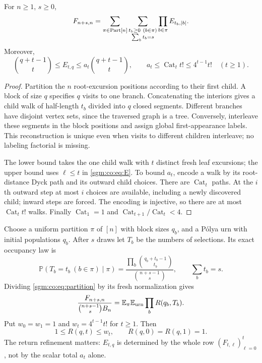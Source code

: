 \documentclass[11pt,letterpaper]{article}
\theoremstyle{remark}\newtheorem{remark}[theorem]{Remark}
\newcommand{\Cat}{\operatorname{Cat}}\newcommand{\E}{\mathbb E}\newcommand{\Prob}{\mathbb P}\newcommand{\ind}{\mathbf 1}
\theoremstyle{definition}\newtheorem{definition}[theorem]{Definition}
\begin{document}
\begin{proposition}\label{sgm:co:prop:partition}
For $n\ge1$, $s\ge0$,
\begin{equation}\label{sgm:co:eq:partition}
 F_{n+s,n}=\sum_{\pi\in\operatorname{Part}[n]}
    \sum_{\substack{t_b\ge0\ (b\in\pi)\\\sum_b t_b=s}}
       \prod_{b\in\pi}E_{t_b,|b|}.
\end{equation}
Moreover,
\begin{equation}\label{sgm:co:eq:Ebds}
 \binom{q+t-1}{t}\le E_{t,q}
 \le a_t\binom{q+t-1}{t},\qquad
 a_t\le\Cat_t t!\le4^{t-1}t!\quad(t\ge1).
\end{equation}
\end{proposition}
\begin{proof}
Partition the $n$ root-excursion positions according to their first child. A block of size $q$ specifies $q$ visits to one branch. Concatenating the interiors gives a child walk of half-length $t_b$ divided into $q$ closed segments. Different branches have disjoint vertex sets, since the traversed graph is a tree. Conversely, interleave these segments in the block positions and assign global first-appearance labels. This reconstruction is unique even when visits to different children interleave; no labeling factorial is missing.

The lower bound takes the one child walk with $t$ distinct fresh leaf excursions; the upper bound uses $\ell\le t$ in \eqref{sgm:co:eq:E}. To bound $a_t$, encode a walk by its root-distance Dyck path and its outward child choices. There are $\Cat_t$ paths. At the $i$th outward step at most $i$ choices are available, including a newly discovered child; inward steps are forced. The encoding is injective, so there are at most $\Cat_t t!$ walks. Finally $\Cat_1=1$ and $\Cat_{t+1}/\Cat_t<4$.
\end{proof}
Choose a uniform partition $\pi$ of $[n]$ with block sizes $q_b$, and a P\'olya urn with initial populations $q_b$. After $s$ draws let $T_b$ be the numbers of selections. Its exact occupancy law is
\[
 \Prob(T_b=t_b\ (b\in\pi)\mid\pi)
 =\frac{\prod_b\binom{q_b+t_b-1}{t_b}}{\binom{n+s-1}{s}},
 \qquad \sum_b t_b=s.
\]
Dividing \eqref{sgm:co:eq:partition} by its fresh normalization gives
\begin{equation}\label{sgm:co:eq:exacturn}
 \frac{F_{n+s,n}}{\binom{n+s-1}{s}B_n}
   =\E_\pi\E_{\rm urn}\prod_bR(q_b,T_b).
\end{equation}
Put $w_0=w_1=1$ and $w_t=4^{t-1}t!$ for $t\ge1$. Then
\begin{equation}\label{sgm:co:eq:Rrough}
 1\le R(q,t)\le w_t,\qquad R(q,0)=R(q,1)=1.
\end{equation}
The return refinement matters: $E_{t,q}$ is determined by the whole row $(F_{t,\ell})_{\ell=0}^t$, not by the scalar total $a_t$ alone.
\end{document}
